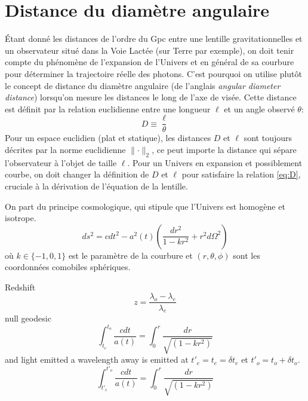 \chapter{Distance du diamètre angulaire}

Étant donné les distances de l'ordre du Gpc entre une lentille gravitationnelles 
et un observateur situé 
dans la Voie Lactée (sur Terre par exemple),
on doit tenir compte du phénomène de l'expansion de l'Univers et en général de sa courbure 
pour déterminer la trajectoire réelle des photons. 
C'est pourquoi on utilise plutôt 
le concept de distance du diamètre angulaire (de l'anglais \textit{angular diameter distance}) 
lorsqu'on mesure les distances le long de l'axe de visée. 
Cette distance est définit par 
la relation euclidienne entre une longueur $\ell$ et un angle observé $\theta$:
\begin{equation}\label{eq:D}
        D \equiv \frac{\ell}{\theta}
\end{equation} 
Pour un espace euclidien (plat et statique), les distances $D$ et $\ell$ 
sont toujours décrites par la norme euclidienne $\lVert \cdot \rVert_2$, 
ce peut importe la distance qui sépare l'observateur à l'objet de taille 
$\ell$.
Pour un Univers en expansion et possiblement courbe, on doit changer la 
définition de $D$ et $\ell$ pour satisfaire la relation \eqref{eq:D}, cruciale 
à la dérivation de l'équation de la lentille.

On part du principe cosmologique, qui stipule que l'Univers est homogène et isotrope.
\begin{equation}\label{eq:FLRW}
        ds^{2} = c dt^{2} - a^{2}(t) \left( \frac{dr^{2}}{1 - kr^{2}} + r^{2}d\Omega^{2} \right)
\end{equation} 
où $k \in \{-1,0,1\}$ est le paramètre de la courbure et $(r,\theta,\phi)$ sont 
les coordonnées comobiles sphériques.

Redshift
\begin{equation}\label{eq:redshift}
       z = \frac{\lambda_o - \lambda_e}{\lambda_e} 
\end{equation} 
null geodesic 
\begin{equation}\label{eq:}
        \int_{t_e}^{t_o} \frac{c dt}{a(t)} = \int_{0}^{r} \frac{dr}{\sqrt{(1 - kr^{2})}}
\end{equation} 
and light emitted a wavelength away is emitted at $t'_e = t_e = \delta t_e$ et 
$t'_o = t_o + \delta t_o$. 
\begin{equation}\label{eq:}
        \int_{t'_e}^{t'_o} \frac{c dt}{a(t)} = \int_{0}^{r} \frac{dr}{\sqrt{(1 - kr^{2})}}
\end{equation} 

